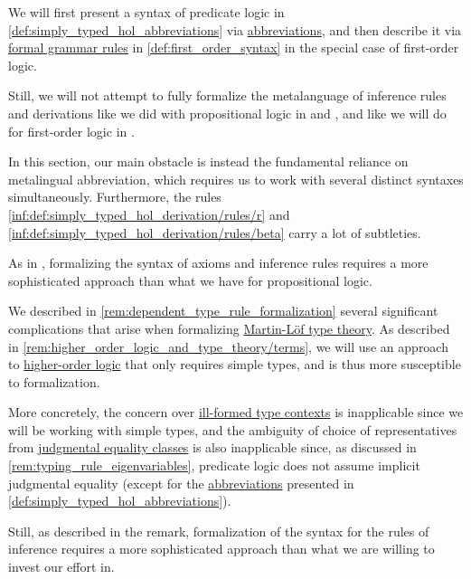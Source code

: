 \begin{remark}\label{rem:predicate_logic_formalization}
  We will first present a syntax of predicate logic in \cref{def:simply_typed_hol_abbreviations} via \hyperref[con:metalingual_abbreviation]{abbreviations}, and then describe it via \hyperref[def:formal_grammar]{formal grammar rules} in \cref{def:first_order_syntax} in the special case of first-order logic.

  Still, we will not attempt to fully formalize the metalanguage of inference rules and derivations like we did with propositional logic in  and , and like we will do for first-order logic in .

  In this section, our main obstacle is instead the fundamental reliance on metalingual abbreviation, which requires us to work with several distinct syntaxes simultaneously. Furthermore, the rules \ref{inf:def:simply_typed_hol_derivation/rules/r} and \ref{inf:def:simply_typed_hol_derivation/rules/beta} carry a lot of subtleties.

  As in , formalizing the syntax of axioms and inference rules requires a more sophisticated approach than what we have for propositional logic.
\end{remark}
\begin{comments}
  \item We described in \cref{rem:dependent_type_rule_formalization} several significant complications that arise when formalizing \hyperref[def:mltt]{Martin-L\"of type theory}. As described in \cref{rem:higher_order_logic_and_type_theory/terms}, we will use an approach to \hyperref[rem:predicate_logic]{higher-order logic} that only requires simple types, and is thus more susceptible to formalization.

  More concretely, the concern over \hyperref[rem:well_formed_contexts]{ill-formed type contexts} is inapplicable since we will be working with simple types, and the ambiguity of choice of representatives from \hyperref[con:equality]{judgmental equality classes} is also inapplicable since, as discussed in \cref{rem:typing_rule_eigenvariables}, predicate logic does not assume implicit judgmental equality (except for the \hyperref[con:metalingual_abbreviation]{abbreviations} presented in \cref{def:simply_typed_hol_abbreviations}).

  Still, as described in the remark, formalization of the syntax for the rules of inference requires a more sophisticated approach than what we are willing to invest our effort in.
\end{comments}

